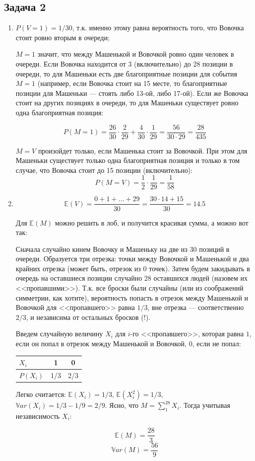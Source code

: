\documentclass[a4paper,12pt]{article}
\theoremstyle{plain}                         %
\theoremstyle{definition}                  %
\theoremstyle{remark}                      %
\begin{document}
\subsection*{Задача 2}
\begin{enumerate}
\item $P(V = 1) = 1/30$, т.к. именно этому равна вероятность того, что Вовочка стоит ровно вторым в очереди;

$M = 1$ значит, что между Машенькой и Вовочкой ровно один человек в очереди. Если Вовочка находится от 3 (включительно) до 28 позиции в очереди, то для Машеньки есть две благоприятные позиции для события $M = 1$ (например, если Вовочка стоит на 15 месте, то благоприятные позиции для Машеньки --- стоять либо 13-ой, либо 17-ой). Если же Вовочка стоит на других позициях в очереди, то для Машеньки существует ровно одна благоприятная позиция:

$$P(M = 1) = \dfrac{26}{30} \cdot \dfrac{2}{29} +  \dfrac{4}{30} \cdot \dfrac{1}{29} = \dfrac{56}{30\cdot 29} = \dfrac{28}{435}$$

$M = V$ произойдет только, если Машенька стоит за Вовочкой. При этом для Машеньки существует только одна благоприятная позиция и только в том случае, что Вовочка стоит до 15 позиции (включительно):
$$P(M = V) = \dfrac{1}{2} \cdot \dfrac{1}{29} = \dfrac{1}{58} $$

\item $$\mathbb{E}(V) = \dfrac{0 + 1 + ... + 29}{30} = \dfrac{30\cdot 14 + 15}{30} = 14.5$$

Для $\mathbb{E}(M)$ можно решить в лоб, и получится красивая сумма, а можно вот так:

Сначала случайно кинем Вовочку и Машеньку на две из 30 позиций в очереди. Образуется три отрезка: точки между Вовочкой и Машенькой и два крайних отрезка (может быть, отрезок из 0 точек). Затем будем закидывать в очередь на оставшиеся позиции случайно 28 оставшихся людей (назовем их <<пропавшими>>). Т.к. все броски были случайны (или из соображений симметрии, как хотите), вероятность попасть в отрезок между Машенькой и Вовочкой для <<пропавшего>> равна $1/3$, вне отрезка --- соответственно $2/3$, и независима от остальных бросков (!).

Введем случайную величину $X_i$ для $i$-го <<пропавшего>>, которая равна $1$, если он попал в отрезок между Машенькой и Вовочкой, $0$, если не попал:


\begin{center}
\begin{tabular}{l|c|c}
$X_i$ & 1 & 0 \\ \hline
$P(X_i)$ & 1/3 & 2/3
\end{tabular}

\end{center}


Легко считается: $\mathbb{E}(X_i) = 1/3$, $\mathbb{E}(X^2_i) = 1/3$, $\mathbb{V}ar(X_i) = 1/3 - 1/9 = 2/9$.
Ясно, что $M = \sum_1^{28} X_i$. Тогда учитывая независимость $X_i$:

$$\mathbb{E}(M) = \dfrac{28}{3}$$
$$\mathbb{V}ar(M) = \dfrac{56}{9}$$
\end{enumerate}
\end{document}
